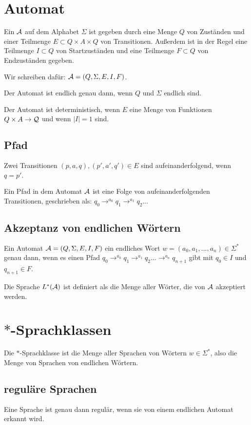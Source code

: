 
\section{Automat}

Ein  $\mathcal{A}$ auf dem Alphabet $\Sigma$ ist gegeben durch eine Menge $Q$ von Zuständen und einer Teilmenge $E \subset Q \times A \times Q$ von Transitionen. Außerdem ist in der Regel eine Teilmenge $I \subset Q$ von Startzuständen und eine Teilmenge $F \subset Q$ von Endzuständen gegeben.

Wir schreiben dafür: $\mathcal{A} = (Q, \Sigma, E, I, F)$.

Der Automat ist endlich genau dann, wenn $Q$ und $\Sigma$ endlich sind.

Der Automat ist deterministisch, wenn $E$ eine Menge von Funktionen $Q \times A \rightarrow \mathcal{Q}$ und wenn $|I| = 1$ sind.

\subsection{Pfad}
Zwei Transitionen $(p,a,q), (p',a',q') \in E$ sind aufeinanderfolgend, wenn $q=p'$.

Ein Pfad in dem Automat $\mathcal{A}$ ist eine Folge von aufeinanderfolgenden Transitionen, geschrieben als:
$q_0 \rightarrow^{a_0} q_1 \rightarrow^{a_1} q_2 \dots$

\subsection{Akzeptanz von endlichen Wörtern}

Ein Automat $\mathcal{A} = (Q, \Sigma, E, I, F)$  ein endliches Wort $w = (a_0,a_1,...,a_n) \in \Sigma^*$ genau dann, wenn es einen Pfad $q_0 \rightarrow^{a_0} q_1 \rightarrow^{a_1} q_2 \dots \rightarrow^{a_n} q_{n+1}$ gibt mit $q_0 \in I$ und $q_{n+1} \in F$.

Die Sprache $L^*(\mathcal{A})$ ist definiert als die Menge aller Wörter, die von $\mathcal{A}$ akzeptiert werden.

\section{$*$-Sprachklassen}
Die $*$-Sprachklasse ist die Menge aller Sprachen von Wörtern $w \in \Sigma^*$, also die Menge von Sprachen von endlichen Wörtern.

\subsection{reguläre Sprachen}
Eine Sprache ist genau dann regulär, wenn sie von einem endlichen Automat erkannt wird.

